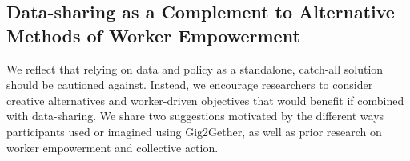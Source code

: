 \subsection{{Data-sharing as a Complement to Alternative Methods of Worker Empowerment}}\label{complement}
{We reflect that relying on data and policy as a standalone, catch-all solution should be cautioned against. Instead, we encourage researchers to consider creative alternatives and worker-driven objectives that would benefit if combined with data-sharing. We share two suggestions motivated by the different ways participants used or imagined using Gig2Gether, as well as prior research on worker empowerment and collective action.}

